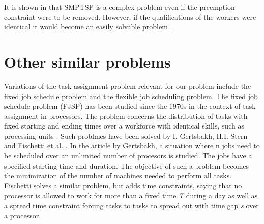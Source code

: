 It is shown in \cite{kroon_1997} that SMPTSP is a complex problem even if the preemption constraint were to be removed. However, if the qualifications of the workers were identical it would become an easily solvable problem \cite{krishnamoorthy_2011}.



%
%
%
%

\section{Other similar problems}\label{other}

Variations of the task assignment problem relevant for our problem include the fixed job schedule problem and the flexible job scheduling problem. The fixed job schedule problem (FJSP) has been studied since the 1970s in the context of task assignment in processors. The problem concerns the distribution of tasks with fixed starting and ending times over a workforce with identical skills, such as processing units \cite{krishnamoorthy_2011}. Such problmes have been solved by I. Gertsbakh, H.I. Stern \cite{Gertsbakh_1977} and Fischetti et al. \cite{fischetti_1992}. In the article by Gertsbakh, a situation where n jobs need to be scheduled over an unlimited number of procesors is studied. The jobs have a specified starting time and duration. The objective of such a problem becomes the minimization of the number of machines needed to perform all tasks. Fischetti solves a similar problem, but adds time constraints, saying that no processor is allowed to work for more than a fixed time \textit{T} during a day as well as a spread time constraint forcing tasks to tasks to spread out with time gap \textit{s} over a processor.	

